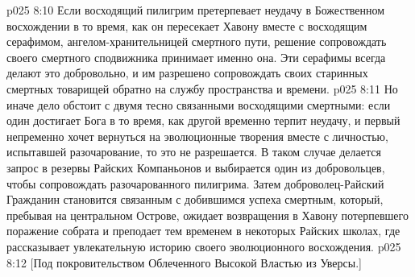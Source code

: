 \vs p025 8:10 Если восходящий пилигрим претерпевает неудачу в Божественном восхождении в то время, как он пересекает Хавону вместе с восходящим серафимом, ангелом\hyp{}хранительницей смертного пути, решение сопровождать своего смертного сподвижника принимает именно она. Эти серафимы всегда делают это добровольно, и им разрешено сопровождать своих старинных смертных товарищей обратно на службу пространства и времени.
\vs p025 8:11 Но иначе дело обстоит с двумя тесно связанными восходящими смертными: если один достигает Бога в то время, как другой временно терпит неудачу, и первый непременно хочет вернуться на эволюционные творения вместе с личностью, испытавшей разочарование, то это не разрешается. В таком случае делается запрос в резервы Райских Компаньонов и выбирается один из добровольцев, чтобы сопровождать разочарованного пилигрима. Затем доброволец\hyp{}Райский Гражданин становится связанным с добившимся успеха смертным, который, пребывая на центральном Острове, ожидает возвращения в Хавону потерпевшего поражение собрата и преподает тем временем в некоторых Райских школах, где рассказывает увлекательную историю своего эволюционного восхождения.
\vsetoff
\vs p025 8:12 [Под покровительством Облеченного Высокой Властью из Уверсы.]
